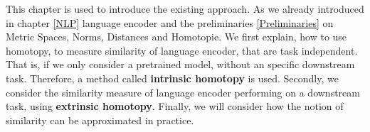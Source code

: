This chapter is used to introduce the existing approach.
As we already introduced in chapter \ref{NLP} language encoder and the preliminaries \ref{Preliminaries} on Metric Spaces, Norms, Distances and Homotopie.
We first explain, how to use homotopy, to measure similarity of language encoder, that are task independent.
That is, if we only consider a pretrained model, without an specific downstream task.
Therefore, a method called \textbf{intrinsic homotopy} is used.
Secondly, we consider the similarity measure of language encoder performing on a downstream task, using \textbf{extrinsic homotopy}.
Finally, we will consider how the notion of similarity can be approximated in practice. 
